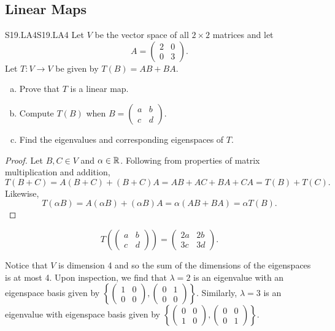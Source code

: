 \documentclass[../AlgebraQualSolutions.tex]{subfiles}
\begin{document}
\subsection{Linear Maps}

	\begin{prob}{S19.LA4}{S19.LA4}
		Let $V$ be the vector space of all $2 \times 2$ matrices and let 
			\[A = \begin{pmatrix} 2 & 0\\ 0 & 3 \end{pmatrix}. \]
		Let $T: V \to V$ be given by $T(B) = AB + BA$.

		\begin{enumerate}[(a)]
			\item Prove that $T$ is a linear map.
			\item Compute $T(B)$ when $B = \begin{pmatrix} a & b \\ c & d \end{pmatrix}$.
			\item Find the eigenvalues and corresponding eigenspaces of $T$.
		\end{enumerate}
	\end{prob}

	\begin{proof}
		Let $B,C \in V$ and $\alpha \in \mathbb{R}$. Following from properties of matrix multiplication and addition,
			\[T(B + C) = A(B+C) + (B+C)A = AB + AC + BA + CA = T(B) + T(C).\]
		Likewise,
			\[T(\alpha B) = A(\alpha B) + (\alpha B)A = \alpha(AB +BA) = \alpha T(B).\]
	\end{proof}

	\begin{solution}
		\[T\left(\begin{pmatrix} a & b \\ c & d \end{pmatrix}\right) = \begin{pmatrix} 2a & 2b \\ 3c & 3d \end{pmatrix}.\]
	\end{solution}

	\begin{solution}
		Notice that $V$ is dimension 4 and so the sum of the dimensions  of the eigenspaces is at most 4. Upon inspection, we find that $\lambda = 2$ is an eigenvalue with an eigenspace basis given by $\left\{ \begin{pmatrix} 1 & 0 \\ 0 & 0 \end{pmatrix}, \begin{pmatrix} 0 & 1 \\ 0 & 0 \end{pmatrix} \right\}$. Similarly, $\lambda = 3$ is an eigenvalue with eigenspace basis given by $\left\{ \begin{pmatrix} 0 & 0 \\ 1 & 0 \end{pmatrix}, \begin{pmatrix} 0 & 0 \\ 0 & 1 \end{pmatrix} \right\}$. 
	\end{solution}
\end{document}
